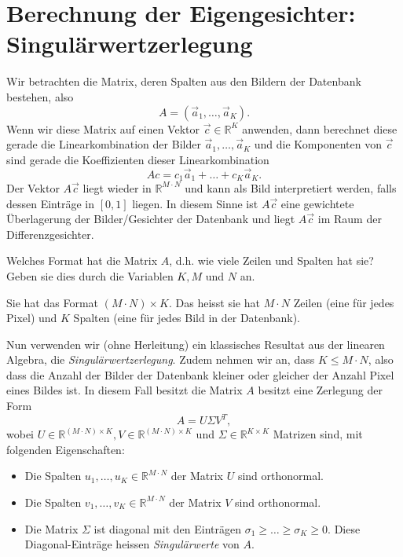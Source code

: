 \section{Berechnung der Eigengesichter: Singulärwertzerlegung}
Wir betrachten die Matrix, deren Spalten aus den Bildern der Datenbank bestehen, also
\begin{equation*}
	A=\left(\vec a_1,\ldots,\vec a_K\right).
\end{equation*}
Wenn wir diese Matrix auf einen Vektor $\vec c\in\mathbb R^K$ anwenden, dann berechnet diese gerade die Linearkombination der Bilder $\vec a_1,\ldots,\vec a_K$ und die Komponenten von $\vec c$ sind gerade die Koeffizienten dieser Linearkombination
\begin{equation*}
	Ac=c_1\vec a_1+\ldots+c_K\vec a_K.
\end{equation*}
Der Vektor $A\vec c$ liegt wieder in $\mathbb R^{M\cdot N}$ und kann als Bild interpretiert werden, falls dessen Einträge in $\left[0,1\right]$ liegen.
In diesem Sinne ist $A\vec c$ eine gewichtete Überlagerung der Bilder/Gesichter der Datenbank und liegt $A\vec c$ im Raum der Differenzgesichter.
\begin{aufgabe}
	Welches Format hat die Matrix $A$, d.h. wie viele Zeilen und Spalten hat sie?
	Geben sie dies durch die Variablen $K,M$ und $N$ an. 
\end{aufgabe}
\begin{losung*}
	Sie hat das Format $\left(M\cdot N\right)\times K$.
	Das heisst sie hat $M\cdot N$ Zeilen (eine für jedes Pixel) und $K$ Spalten (eine für jedes Bild in der Datenbank).
\end{losung*}
Nun verwenden wir (ohne Herleitung) ein klassisches Resultat aus der linearen Algebra, die \textit{Singulärwertzerlegung}.
Zudem nehmen wir an, dass $K\leq M\cdot N$, also dass die Anzahl der Bilder der Datenbank kleiner oder gleicher der Anzahl Pixel eines Bildes ist.
In diesem Fall besitzt die Matrix $A$ besitzt eine Zerlegung der Form
\begin{equation*}
	A=U\Sigma V^T,
\end{equation*}
wobei $U\in\mathbb R^{\left(M\cdot N\right)\times K},V\in\mathbb R^{\left(M\cdot N\right)\times K}$ und $\Sigma\in\mathbb R^{K\times K}$ Matrizen sind, mit folgenden Eigenschaften:
\begin{itemize}
	\item Die Spalten $u_1,\ldots,u_K\in\mathbb R^{M\cdot N}$ der Matrix $U$ sind orthonormal.
	\item Die Spalten $v_1,\ldots,v_K\in\mathbb R^{M\cdot N}$ der Matrix $V$ sind orthonormal.
	\item Die Matrix $\Sigma$ ist diagonal mit den Einträgen $\sigma_1\geq\ldots\geq\sigma_K\geq 0$.
	Diese Diagonal-Einträge heissen \textit{Singulärwerte} von $A$.
\end{itemize}
